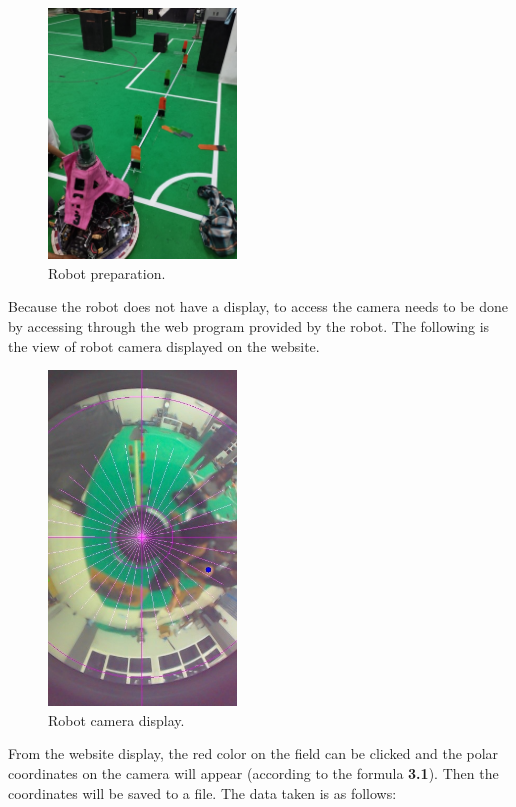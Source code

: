 \begin{figure}[ht]
  \centering
  \includegraphics[width=5cm]{gambar/ambil_data.jpeg}
  \caption{Robot preparation.}
  \label{fig:persiapanrobot}
\end{figure}

Because the robot does not have a display, to access the camera needs to be done by accessing through the web program provided by the robot. The following is the view of robot camera displayed on the website.

\begin{figure}[ht]
  \centering
  \includegraphics[width=5cm]{gambar/iris_web.jpeg}
  \caption{Robot camera display.}
  \label{fig:webrobot}
\end{figure}

From the website display, the red color on the field can be clicked and the polar coordinates on the camera will appear (according to the formula \textbf{3.1}). Then the coordinates will be saved to a file. The data taken is as follows:

